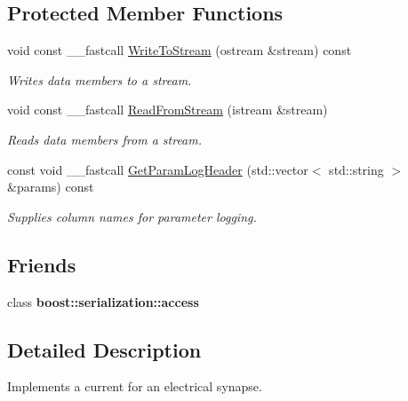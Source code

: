 \subsection*{Protected Member Functions}
\begin{DoxyCompactItemize}
\item 
\hypertarget{class_t_playback_current_a3404d1aae6418c9fad506bcbb785f0b9}{void const \+\_\+\+\_\+fastcall \hyperlink{class_t_playback_current_a3404d1aae6418c9fad506bcbb785f0b9}{Write\+To\+Stream} (ostream \&stream) const }\label{class_t_playback_current_a3404d1aae6418c9fad506bcbb785f0b9}

\begin{DoxyCompactList}\small\item\em Writes data members to a stream. \end{DoxyCompactList}\item 
\hypertarget{class_t_playback_current_a9f595f63d44ad217c268904cb6cc390c}{void const \+\_\+\+\_\+fastcall \hyperlink{class_t_playback_current_a9f595f63d44ad217c268904cb6cc390c}{Read\+From\+Stream} (istream \&stream)}\label{class_t_playback_current_a9f595f63d44ad217c268904cb6cc390c}

\begin{DoxyCompactList}\small\item\em Reads data members from a stream. \end{DoxyCompactList}\item 
const void \+\_\+\+\_\+fastcall \hyperlink{class_t_playback_current_acc4966648d397dfb5c368eef25249170}{Get\+Param\+Log\+Header} (std\+::vector$<$ std\+::string $>$ \&params) const 
\begin{DoxyCompactList}\small\item\em Supplies column names for parameter logging. \end{DoxyCompactList}\end{DoxyCompactItemize}
\subsection*{Friends}
\begin{DoxyCompactItemize}
\item 
\hypertarget{class_t_playback_current_ac98d07dd8f7b70e16ccb9a01abf56b9c}{class {\bfseries boost\+::serialization\+::access}}\label{class_t_playback_current_ac98d07dd8f7b70e16ccb9a01abf56b9c}

\end{DoxyCompactItemize}


\subsection{Detailed Description}
Implements a current for an electrical synapse. 

